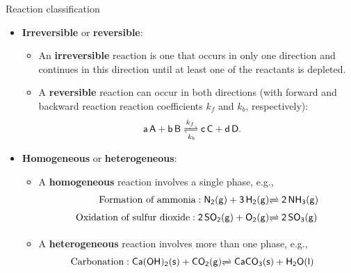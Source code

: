 %
%
\begin{frame}{Reaction classification}
	\begin{itemize}
		\item \alert{\bf Irreversible} or \alert{\bf reversible}:
		\begin{itemize}
			\item An {\bf irreversible} reaction is one that occurs in only one direction and continues in this direction until at least one of the reactants is depleted.
			\item A {\bf reversible} reaction can occur in both directions (with forward and backward reaction reaction coefficients $k_f$ and $k_b$, respectively):
			\[	
			\mathsf{a\,A + b\,B} \xrightleftharpoons[k_b]{k_f} \mathsf{c\,C + d\,D}.
			\quad
			\]
		\end{itemize}
		\item \alert{\bf Homogeneous} or \alert{\bf heterogeneous}:
		\begin{itemize}
			\item A {\bf homogeneous} reaction involves a single phase, e.g., 
			\begin{alignat*}{2}
				\mbox{Formation of ammonia}:  \mathsf{N_2(g) + 3\,H_2(g) } & \mathsf{\xrightleftharpoons[]{} 2\,NH_3(g)}\\
				\mbox{Oxidation of sulfur dioxide}: \mathsf{2\,SO_2(g) + O_2(g) } & \mathsf{\xrightleftharpoons[]{} 2\,SO_3(g)} 
			\end{alignat*}
			\item A {\bf heterogeneous} reaction involves more than one phase, e.g., 
			\begin{alignat*}{2}
				\mbox{Carbonation} : \mathsf{Ca(OH)_2(s) + CO_2(g)} & \mathsf{\xrightleftharpoons[]{} CaCO_3(s) + H_2O(l)}
			\end{alignat*}
		\end{itemize}
		
	\end{itemize}
\end{frame}
%

